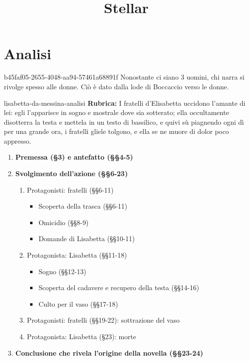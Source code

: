 \documentclass[preview]{standalone}
\begin{document}
\title{Stellar}
\genpage

\section{Analisi}

\begin{snippetnote}{b45faf05-2655-4048-aa94-57461a68891f}{}
    Nonostante ci siano 3 uomini, chi narra si rivolge spesso alle donne.
    Ciò è dato dalla lode di Boccaccio verso le donne.
\end{snippetnote}

\begin{snippet}{lisabetta-da-messina-analisi}
    \textbf{Rubrica:} I fratelli d'Elisabetta uccidono
    l'amante di lei: egli l'apparisce
    in sogno e mostrale dove sia sotterato;
    ella occultamente disotterra la testa e mettela in un testo di bassilico,
    e quivi sù piagnendo ogni dì per una grande ora, i fratelli gliele tolgono,
    e ella se ne muore di dolor poco appresso.

    \begin{enumerate}
        \item \textbf{Premessa (§3) e antefatto (§§4-5)}
        \item \textbf{Svolgimento dell'azione (§§6-23)}
        \begin{enumerate}
            \item Protagonisti: fratelli (§§6-11)
            \begin{itemize}
                \item Scoperta della trasca (§§6-11)
                \item Omicidio (§§8-9)
                \item Domande di Lisabetta (§§10-11)
            \end{itemize}
            \item Protagonista: Lisabetta (§§11-18)
            \begin{itemize}
                \item Sogno (§§12-13)
                \item Scoperta del cadavere e recupero della testa (§§14-16)
                \item Culto per il vaso (§§17-18)
            \end{itemize}
            \item Protagonisti: fratelli (§§19-22): sottrazione del vaso
            \item Protagonista: Lisabetta (§23): morte
        \end{enumerate}
        \item \textbf{Conclusione che rivela l'origine della novella (§§23-24)}
    \end{enumerate}


\end{snippet}
\end{document}
